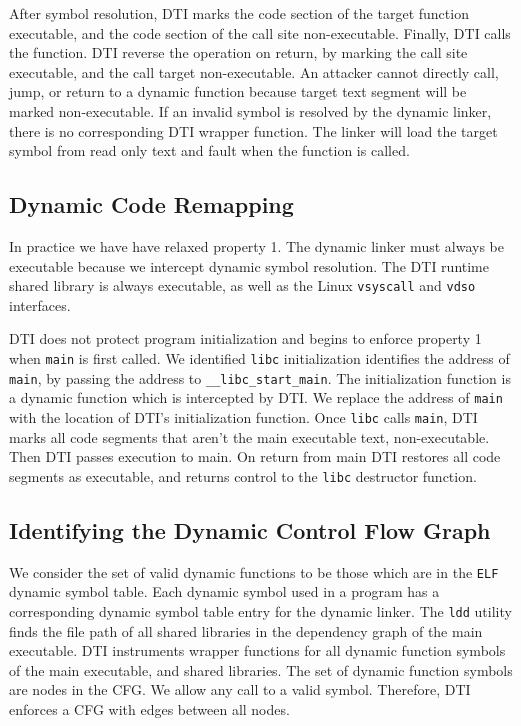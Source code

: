 \documentclass[letterpaper,twocolumn,10pt]{article}
\begin{document}
    After symbol resolution, DTI marks the code section of the target function executable, and the code section of the call site non-executable. Finally, DTI calls the function. DTI reverse the operation on return, by marking the call site executable, and the call target non-executable. An attacker cannot directly call, jump, or return to a dynamic function because target text segment will be marked non-executable. If an invalid symbol is resolved by the dynamic linker, there is no corresponding DTI wrapper function. The linker will load the target symbol from read only text and fault when the function is called. 
    
    \subsection{Dynamic Code Remapping}
    
    In practice we have have relaxed property 1. The dynamic linker must always be executable because we intercept dynamic symbol resolution. The DTI runtime shared library is always  executable, as well as the Linux {\tt vsyscall} and {\tt vdso} interfaces. 
    
    DTI does not protect program initialization and begins to enforce property 1 when {\tt main} is first called. We identified {\tt libc} initialization identifies the address of {\tt main}, by passing the address to {\tt \_\_libc\_start\_main}. The initialization function is a dynamic function which is intercepted by DTI. We replace the address of {\tt main} with the location of DTI's initialization function. Once {\tt libc} calls {\tt main}, DTI marks all code segments that aren't the main executable text, non-executable. Then DTI passes execution to main. On return from main DTI restores all code segments as executable, and returns control to the {\tt libc} destructor function.  

    \subsection{Identifying the Dynamic Control Flow Graph}

    We consider the set of valid dynamic functions to be those which are in the {\tt ELF} dynamic symbol table. Each dynamic symbol used in a program has a corresponding dynamic symbol table entry for the dynamic linker. The {\tt ldd} utility finds the file path of all shared libraries in the dependency graph of the main executable. DTI instruments wrapper functions for all dynamic function symbols of the main executable, and shared libraries. The set of dynamic function symbols are nodes in the CFG. We allow any call to a valid symbol. Therefore, DTI enforces a CFG with edges between all nodes. 
    
\end{document}
